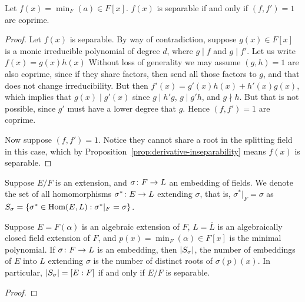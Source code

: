 \begin{lemma}
    Let \(f(x) = \min_F(a) \in F[x]\).
    \(f(x)\) is separable if and only if \((f,f') = 1\) are coprime.
\end{lemma}
\begin{proof}
    Let \(f(x)\) is separable.
    By way of contradiction,
    suppose \(g(x) \in F[x]\) is a monic irreducible polynomial of degree \(d\),
    where \(g \mid f\) and \(g \mid f'\).
    Let us write \(f(x) = g(x)h(x)\)
    Without loss of generality we may assume \((g,h) = 1\) are also coprime,
    since if they share factors, then send all those factors to \(g\),
    and that does not change irreducibility.
    But then \(f'(x) = g'(x)h(x) + h'(x)g(x)\),
    which implies that \(g(x) \mid g'(x)\)
    since \(g \mid h'g\), \(g \mid g'h\), and \(g \nmid h\).
    But that is not possible, since \(g'\) must have a lower degree that \(g\).
    Hence \((f,f') = 1\) are coprime.

    Now suppose \((f,f') = 1\).
    Notice they cannot share a root in the splitting field in this case,
    which by Proposition~\ref{prop:derivative-inseparability}
    means \(f(x)\) is separable.
\end{proof}

\begin{definition}
    Suppose \(E/F\) is an extension,
    and \(\sigma\colon F\to L\) an embedding of fields.
    We denote the set of all homomorphisms \(\sigma^\ast\colon E\to L\)
    extending \(\sigma\), that is, \(\sigma^\ast\vert_F = \sigma\) as
    \(S_\sigma = \{\sigma^\ast\in\operatorname{Hom}(E,L) : \sigma^\ast\vert_F = \sigma\}\).
\end{definition}
\begin{theorem}\label{thm:simple-extension-hom-count}
    Suppose \(E = F(\alpha)\) is an algebraic extension of \(F\),
    \(L = \overline{L}\) is an algebraically closed field extension of \(F\),
    and \(p(x) = \min_F(\alpha) \in F[x]\) is the minimal polynomial.
    If \(\sigma\colon F\to L\) is an embedding,
    then \(\abs{S_\sigma}\),
    the number of embeddings of \(E\) into \(L\) extending \(\sigma\)
    is the number of distinct roots of \(\sigma(p)(x)\).
    In particular, \(\abs{S_\sigma} = [E:F]\)
    if and only if \(E/F\) is separable.
\end{theorem}
\begin{proof}
\end{proof}

